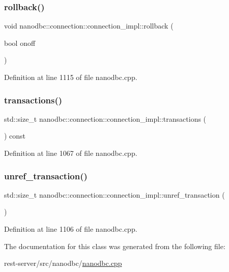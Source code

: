 \subsubsection{\texorpdfstring{rollback()}{rollback()}\hspace{0.1cm}{\footnotesize\ttfamily [2/2]}}
{\footnotesize\ttfamily void nanodbc\+::connection\+::connection\+\_\+impl\+::rollback (\begin{DoxyParamCaption}\item[{bool}]{onoff }\end{DoxyParamCaption})\hspace{0.3cm}{\ttfamily [inline]}}



Definition at line 1115 of file nanodbc.\+cpp.

\mbox{\label{classnanodbc_1_1connection_1_1connection__impl_a13d80445241c6d01e8bbb631d685b54b}} 
\subsubsection{\texorpdfstring{transactions()}{transactions()}}
{\footnotesize\ttfamily std\+::size\+\_\+t nanodbc\+::connection\+::connection\+\_\+impl\+::transactions (\begin{DoxyParamCaption}{ }\end{DoxyParamCaption}) const\hspace{0.3cm}{\ttfamily [inline]}}



Definition at line 1067 of file nanodbc.\+cpp.

\mbox{\label{classnanodbc_1_1connection_1_1connection__impl_a1bc596d69ce38c3b214f5974f37f6232}} 
\subsubsection{\texorpdfstring{unref\_transaction()}{unref\_transaction()}}
{\footnotesize\ttfamily std\+::size\+\_\+t nanodbc\+::connection\+::connection\+\_\+impl\+::unref\+\_\+transaction (\begin{DoxyParamCaption}{ }\end{DoxyParamCaption})\hspace{0.3cm}{\ttfamily [inline]}}



Definition at line 1106 of file nanodbc.\+cpp.



The documentation for this class was generated from the following file\+:\begin{DoxyCompactItemize}
\item 
rest-\/server/src/nanodbc/\mbox{\hyperlink{nanodbc_8cpp}{nanodbc.\+cpp}}\end{DoxyCompactItemize}
